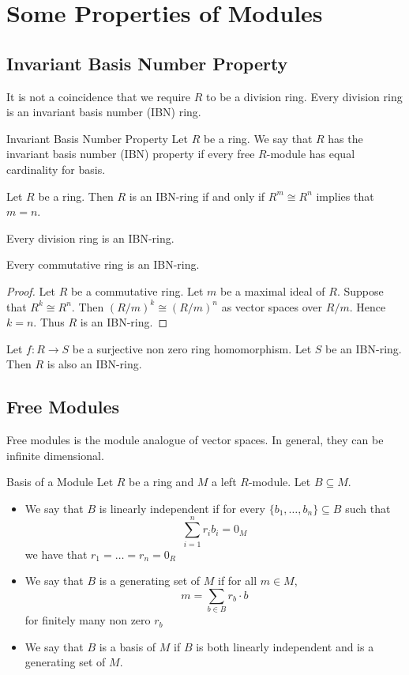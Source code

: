 \documentclass[a4paper]{article}
\begin{document}
\pagebreak
\section{Some Properties of Modules}
\subsection{Invariant Basis Number Property}
It is not a coincidence that we require $R$ to be a division ring. Every division ring is an invariant basis number (IBN) ring. 

\begin{defn}{Invariant Basis Number Property}{} Let $R$ be a ring. We say that $R$ has the invariant basis number (IBN) property if every free $R$-module has equal cardinality for basis. 
\end{defn}

\begin{prp}{}{} Let $R$ be a ring. Then $R$ is an IBN-ring if and only if $R^m\cong R^n$ implies that $m=n$. 
\end{prp}

\begin{prp}{}{} Every division ring is an IBN-ring. 
\end{prp}

\begin{prp}{}{} Every commutative ring is an IBN-ring. \tcbline
\begin{proof}
Let $R$ be a commutative ring. Let $m$ be a maximal ideal of $R$. Suppose that $R^k\cong R^n$. Then $(R/m)^k\cong(R/m)^n$ as vector spaces over $R/m$. Hence $k=n$. Thus $R$ is an IBN-ring. 
\end{proof}
\end{prp}

\begin{prp}{}{} Let $f:R\to S$ be a surjective non zero ring homomorphism. Let $S$ be an IBN-ring. Then $R$ is also an IBN-ring. 
\end{prp}

\subsection{Free Modules}
Free modules is the module analogue of vector spaces. In general, they can be infinite dimensional. 

\begin{defn}{Basis of a Module}{} Let $R$ be a ring and $M$ a left $R$-module. Let $B\subseteq M$. 
\begin{itemize}
\item We say that $B$ is linearly independent if for every $\{b_1,\dots,b_n\}\subseteq B$ such that $$\sum_{i=1}^nr_ib_i=0_M$$ we have that $r_1=\dots=r_n=0_R$
\item We say that $B$ is a generating set of $M$ if for all $m\in M$, $$m=\sum_{b\in B}r_b\cdot b$$ for finitely many non zero $r_b$
\item We say that $B$ is a basis of $M$ if $B$ is both linearly independent and is a generating set of $M$. 
\end{itemize}
\end{defn}
\end{document}
